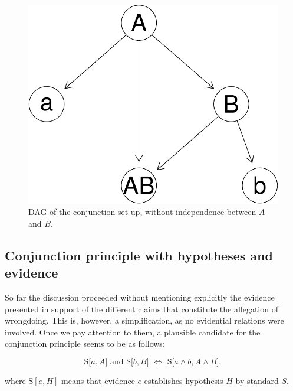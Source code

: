 \documentclass[
  10pt,
  dvipsnames,enabledeprecatedfontcommands]{scrartcl}
\begin{document}
\begin{figure}[h]

\begin{center}\includegraphics[width=0.6\linewidth]{conjunction-paradox_files/figure-latex/fig:conjunctionDAG2-1} \end{center}
\caption{DAG of the conjunction set-up, without independence between $A$ and $B$.}
\label{fig:conjunctionDAG2}
\end{figure}

\hypertarget{conjunction-principle-with-hypotheses-and-evidence}{%
\subsection{Conjunction principle with hypotheses and
evidence}\label{conjunction-principle-with-hypotheses-and-evidence}}

So far the discussion proceeded without mentioning explicitly the
evidence presented in support of the different claims that constitute
the allegation of wrongdoing. This is, however, a simplification, as no
evidential relations were involved. Once we pay attention to them, a
plausible candidate for the conjunction principle seems to be as
follows:

\[\text{S[$a, A$] and S[$b, B$] $\Leftrightarrow$ S[$a \wedge b, A\wedge B$]},\]

\noindent where \(\text{S}[e, H]\) means that evidence \(e\) establishes
hypothesis \(H\) by standard \(S\).
\end{document}
